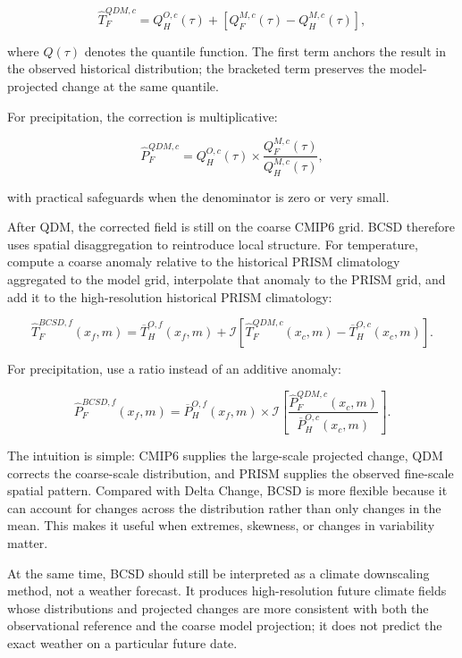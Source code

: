 \documentclass[11pt]{article}
\begin{document}
\begin{equation}
\widehat{T}_{F}^{QDM,c}
=
Q_H^{O,c}(\tau)
+
\left[
Q_F^{M,c}(\tau)-Q_H^{M,c}(\tau)
\right],
\end{equation}

where $Q(\tau)$ denotes the quantile function. The first term anchors the result in the observed historical distribution; the bracketed term preserves the model-projected change at the same quantile.

For precipitation, the correction is multiplicative:

\begin{equation}
\widehat{P}_{F}^{QDM,c}
=
Q_H^{O,c}(\tau)
\times
\frac{Q_F^{M,c}(\tau)}{Q_H^{M,c}(\tau)},
\end{equation}

with practical safeguards when the denominator is zero or very small.

After QDM, the corrected field is still on the coarse CMIP6 grid. BCSD therefore uses spatial disaggregation to reintroduce local structure. For temperature, compute a coarse anomaly relative to the historical PRISM climatology aggregated to the model grid, interpolate that anomaly to the PRISM grid, and add it to the high-resolution historical PRISM climatology:

\begin{equation}
\widehat{T}_{F}^{BCSD,f}(x_f,m)
=
\overline{T}_{H}^{O,f}(x_f,m)
+
\mathcal{I}\left[
\widehat{T}_{F}^{QDM,c}(x_c,m)-\overline{T}_{H}^{O,c}(x_c,m)
\right].
\end{equation}

For precipitation, use a ratio instead of an additive anomaly:

\begin{equation}
\widehat{P}_{F}^{BCSD,f}(x_f,m)
=
\overline{P}_{H}^{O,f}(x_f,m)
\times
\mathcal{I}\left[
\frac{\widehat{P}_{F}^{QDM,c}(x_c,m)}{\overline{P}_{H}^{O,c}(x_c,m)}
\right].
\end{equation}

The intuition is simple: CMIP6 supplies the large-scale projected change, QDM corrects the coarse-scale distribution, and PRISM supplies the observed fine-scale spatial pattern. Compared with Delta Change, BCSD is more flexible because it can account for changes across the distribution rather than only changes in the mean. This makes it useful when extremes, skewness, or changes in variability matter.

At the same time, BCSD should still be interpreted as a climate downscaling method, not a weather forecast. It produces high-resolution future climate fields whose distributions and projected changes are more consistent with both the observational reference and the coarse model projection; it does not predict the exact weather on a particular future date.
\end{document}
